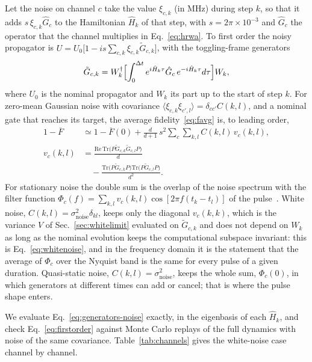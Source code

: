 \documentclass[aps,prx,twocolumn,superscriptaddress,nofootinbib,amsmath,amssymb,floatfix]{revtex4-2}
\newcommand{\Fbar}{\overline{F}}
\newcommand{\snoise}{\sigma_{\mathrm{noise}}}
\begin{document}
Let the noise on channel $c$ take the value $\xi_{c,k}$ (in MHz) during step $k$, so that it adds
$s\,\xi_{c,k}\hat G_c$ to the Hamiltonian $\hat H_k$ of that step, with $s=2\pi\times10^{-3}$ and
$\hat G_c$ the operator that the channel multiplies in Eq.~\eqref{eq:hrwa}. To first order the noisy
propagator is $U=U_0\bigl[1-is\sum_{c,k}\xi_{c,k}\tilde G_{c,k}\bigr]$, with the toggling-frame generators
\begin{equation}
\tilde G_{c,k}=W_k^\dagger\Bigl[\int_0^{\Delta t}e^{i\hat H_k\tau}\hat G_c\,e^{-i\hat H_k\tau}d\tau\Bigr]W_k ,
\label{eq:generators-noise}
\end{equation}
where $U_0$ is the nominal propagator and $W_k$ its part up to the start of step $k$. For zero-mean
Gaussian noise with covariance $\langle\xi_{c,k}\xi_{c',l}\rangle=\delta_{cc'}C(k,l)$, and a nominal gate
that reaches its target, the average fidelity~\eqref{eq:favg} is, to leading order,
\begin{align}
1-\Fbar&\simeq1-\Fbar(0)+\frac{d}{d+1}\,s^2\sum_c\sum_{k,l}C(k,l)\,v_c(k,l),
\nonumber\\
v_c(k,l)&=\frac{\mathrm{Re}\,\mathrm{Tr}\bigl(P\tilde G_{c,k}\tilde G_{c,l}P\bigr)}{d}
\nonumber\\
&\quad-\frac{\mathrm{Tr}\bigl(P\tilde G_{c,k}P\bigr)\mathrm{Tr}\bigl(P\tilde G_{c,l}P\bigr)}{d^2}.
\label{eq:firstorder}
\end{align}
For stationary noise the double sum is the overlap of the noise spectrum with the filter function
$\Phi_c(f)=\sum_{k,l}v_c(k,l)\cos[2\pi f(t_k-t_l)]$ of the
pulse~\cite{Green2012,Green2013,Cerfontaine2021}. White noise, $C(k,l)=\snoise^2\delta_{kl}$, keeps only
the diagonal $v_c(k,k)$, which is the variance $V$ of Sec.~\ref{sec:whitelimit} evaluated on
$\tilde G_{c,k}$ and does not depend on $W_k$ as long as the nominal evolution keeps the computational
subspace invariant: this is Eq.~\eqref{eq:whitenoise}, and in the frequency domain it is the statement
that the average of $\Phi_c$ over the Nyquist band is the same for every pulse of a given duration.
Quasi-static noise, $C(k,l)=\snoise^2$, keeps the whole sum, $\Phi_c(0)$, in which generators at different
times can add or cancel; that is where the pulse shape enters.

We evaluate Eq.~\eqref{eq:generators-noise} exactly, in the eigenbasis of each $\hat H_k$, and check
Eq.~\eqref{eq:firstorder} against Monte Carlo replays of the full dynamics with noise of the same
covariance. Table~\ref{tab:channels} gives the white-noise case channel by channel.
\end{document}
